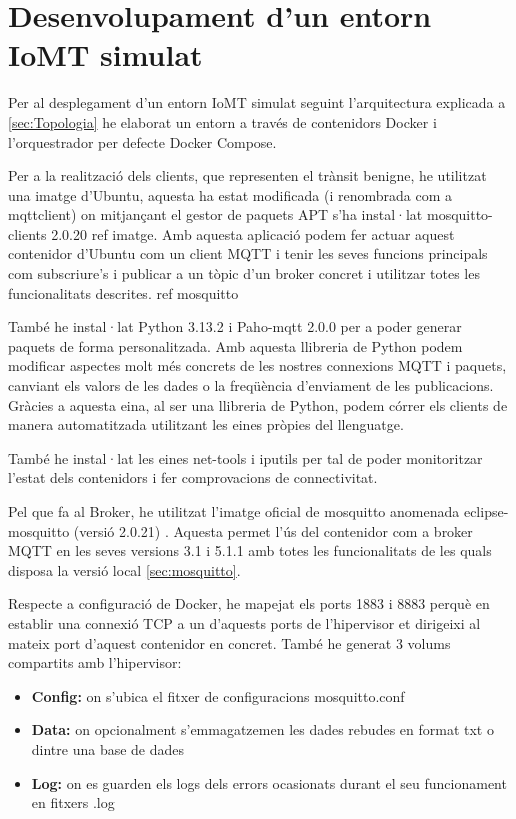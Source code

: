 \chapter{Desenvolupament d’un entorn IoMT simulat}
Per al desplegament d’un entorn IoMT simulat seguint l’arquitectura explicada a \ref{sec:Topologia} he elaborat un entorn a través de contenidors Docker i l’orquestrador per defecte Docker Compose.

Per a la realització dels clients, que representen el trànsit benigne, he utilitzat una imatge d’Ubuntu, aquesta ha estat modificada (i renombrada com a mqttclient) on mitjançant el gestor de paquets APT  s'ha instal·lat mosquitto-clients 2.0.20 {ref imatge}. Amb aquesta aplicació podem fer actuar aquest contenidor d'Ubuntu com un client MQTT i tenir les seves funcions principals com subscriure’s i publicar a un tòpic d’un broker concret i utilitzar totes les funcionalitats descrites. {ref mosquitto}

També he instal·lat Python 3.13.2 i Paho-mqtt 2.0.0 \cite{pahoexp} per a poder generar paquets de forma personalitzada. Amb aquesta llibreria de Python podem modificar aspectes molt més concrets de les nostres connexions MQTT i paquets, canviant els valors de les dades o la freqüència d’enviament de les publicacions. Gràcies a aquesta eina, al ser una llibreria de Python, podem córrer els clients de manera automatitzada utilitzant les eines pròpies del llenguatge.

També he instal·lat les eines net-tools i iputils per tal de poder monitoritzar l’estat dels contenidors i fer comprovacions de connectivitat.


Pel que fa al Broker, he utilitzat l’imatge oficial de mosquitto anomenada eclipse-mosquitto (versió 2.0.21) \cite{mosquittoimg}. Aquesta permet l’ús del contenidor com a broker MQTT en les seves versions 3.1 i 5.1.1 amb totes les funcionalitats de les quals disposa la versió local \ref{sec:mosquitto}.

Respecte a configuració de Docker, he mapejat els ports 1883 i 8883 perquè en establir una connexió TCP a un d’aquests ports de l'hipervisor et dirigeixi al mateix port d’aquest contenidor en concret. També he generat 3 volums compartits amb l'hipervisor:
\begin{itemize}
    \item \textbf{Config:} on s’ubica el fitxer de configuracions mosquitto.conf
    \item \textbf{Data:} on opcionalment s'emmagatzemen les dades rebudes en format txt o dintre una base de dades
    \item \textbf{Log:} on es guarden els logs dels errors ocasionats durant el seu funcionament en fitxers .log
\end{itemize} 

